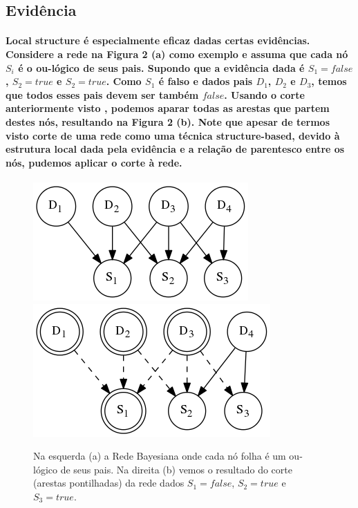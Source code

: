 \documentclass[a4paper,10pt]{article}
\theoremstyle{plain}
\begin{document}
\subsection{Evidência}

\paragraph{
  Local structure é especialmente eficaz dadas certas evidências. Considere a rede na Figura 2 (a)
  como exemplo e assuma que cada nó $S_i$ é o ou-lógico de seus pais. Supondo que a evidência dada
  é $S_1=false$, $S_2=true$ e $S_2=true$. Como $S_1$ é falso e dados pais $D_1$, $D_2$ e $D_3$,
  temos que todos esses pais devem ser também $false$. Usando o corte anteriormente visto
  \cite{report-5}, podemos aparar todas as arestas que partem destes nós, resultando na Figura 2
  (b). Note que apesar de termos visto corte de uma rede como uma técnica structure-based, devido
  à estrutura local dada pela evidência e a relação de parentesco entre os nós, pudemos aplicar
  o corte à rede.
}

\begin{figure}[h]
  \centering\includegraphics[scale=0.4]{imgs/evidence_a.png}
  \quad \quad \quad \quad \quad \quad
  \centering\includegraphics[scale=0.4]{imgs/evidence_b.png}
  \caption{Na esquerda (a) a Rede Bayesiana onde cada nó folha é um ou-lógico de seus pais.
    Na direita (b) vemos o resultado do corte\cite{report-5} (arestas pontilhadas) da rede dados
    $S_1=false$, $S_2=true$ e $S_3=true$.}
\end{figure}

\newpage

\printbibliography
\end{document}
